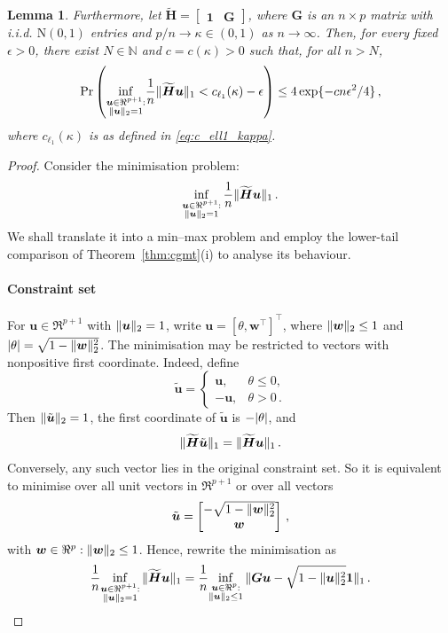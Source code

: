 \documentclass{article}
\makeatletter
\newtheorem{lemma}{Lemma}
\theoremstyle{definition}
\newcommand{\vnorm}[1]{%
	\ensuremath{%
		\if@display
		\left\| #1 \right\|
		\else
		\| #1 \|
		\fi
	}%
}
\newcommand{\abs}[1]{%
	\ensuremath{%
		\if@display
		\left| #1 \right|
		\else
		\lvert #1 \rvert
		\fi
	}%
}
\newcommand*{\bb}{\boldsymbol}
\def\bw {\bb{w}}
\def\bH {\bb{H}}
\def\bu{\bb{u}}
\def\bH{\bb{H}}
\makeatother
\begin{document}
\begin{bibunit}
\begin{lemma}
	Furthermore, let $\widetilde{\bH} = \begin{bmatrix} \bb 1 & \bb G \end{bmatrix}$, where $\bb G$ is an $n \times p$ matrix with i.i.d. $\mathrm{N}(0,1)$ entries and $p/n \to \kappa \in (0,1)$ as $n \to \infty$.
	Then, for every fixed $\epsilon>0$, there exist $N\in\mathbb{N}$ and $c=c(\kappa)>0$ such that, for all $n>N$,
	$$
	    \Pr\left(
	    \underset{\substack{\bu \in \Re^{p + 1}:\\ \vnorm{\bu}_2 = 1}}{\inf}
	    \frac{1}{n}\vnorm{\widetilde{\bH}  \bu}_1
	    < c_{\ell_1}(\kappa) - \epsilon
	    \right)
	    \leq
	    4\exp\{-cn\epsilon^2/4\} \,,
	$$
	where $c_{\ell_1}(\kappa)$ is as defined in \eqref{eq:c_ell1_kappa}.
\end{lemma}
\begin{proof}
	Consider the minimisation problem:
	$$
	\underset{\substack{\bu \in \Re^{p + 1}:\\ \vnorm{\bu}_2 = 1}}{\inf}\, \frac{1}{n}\vnorm{\widetilde{\bH}  \bu}_1\,.
	$$
	We shall translate it into a min--max problem and employ the lower-tail comparison of Theorem~\ref{thm:cgmt}(i) to analyse its behaviour.
	\paragraph*{Constraint set}
	For $\bu\in\Re^{p+1}$ with $\vnorm{\bu}_2=1$, write
	$\bu=[\theta,\bw^\top]^\top$, where $\vnorm{\bw}_2\leq1$ and
	$\abs{\theta}=\sqrt{1-\vnorm{\bw}_2^2}$. The minimisation may be
	restricted to vectors with nonpositive first coordinate. Indeed, define
	$$
	\tilde{\bu}
	=
	\begin{cases}
	\bu, & \theta\leq0,\\
	-\bu, & \theta>0\,.
	\end{cases}
	$$
	Then $\vnorm{\tilde{\bu}}_2=1$, the first coordinate of
	$\tilde{\bu}$ is $-\abs{\theta}$, and
	$$
	\vnorm{\widetilde{\bH}\tilde{\bu}}_1
	=
	\vnorm{\widetilde{\bH}\bu}_1 \,.
	$$
	Conversely, any such vector lies in the original constraint set. So it is equivalent to minimise over all unit vectors in $\Re^{p+1}$ or over all vectors
	$$
	\tilde{\bu} = \begin{bmatrix}
		-\sqrt{1 - \vnorm{\bw}_2^2} \\
		\bw
	\end{bmatrix}\,,
	$$
	with $\bw \in \Re^p: \vnorm{\bw}_2 \leq 1$.
	Hence, rewrite the minimisation as
	$$
	\frac{1}{n}\underset{\substack{\bu \in \Re^{p + 1}: \\ \vnorm{\bu}_2 = 1}}{\inf}\, \vnorm{\widetilde{\bH} \bu}_1 = \frac{1}{n}\underset{\substack{\bu \in \Re^{p}: \\ \vnorm{\bu}_2 \leq 1}}{\inf}\, \vnorm{\bb G \bu - \sqrt{1 - \vnorm{\bu}_2^2} \bb 1}_1 \,.
	$$

\end{proof}
\end{bibunit}
\end{document}
